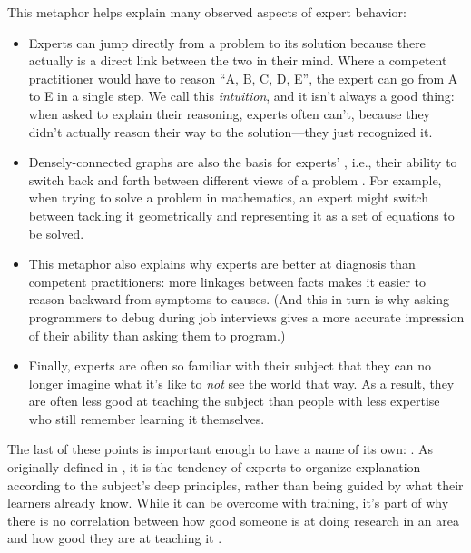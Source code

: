 This metaphor helps explain many observed aspects of expert behavior:

\begin{itemize}

\item
  Experts can jump directly from a problem to its solution because there
  actually is a direct link between the two in their mind. Where a
  competent practitioner would have to reason ``A, B, C, D, E'', the
  expert can go from A to E in a single step. We call this
  \emph{intuition}, and it isn't always a good thing: when asked to
  explain their reasoning, experts often can't, because they didn't
  actually reason their way to the solution---they just recognized it.

\item
  Densely-connected graphs are also the basis for experts'
  , i.e.,
  their ability to switch back and forth between different views of a
  problem \cite{Petr2016}. For example, when trying to solve a problem
  in mathematics, an expert might switch between tackling it
  geometrically and representing it as a set of equations to be
  solved.

\item
  This metaphor also explains why experts are better at diagnosis than
  competent practitioners: more linkages between facts makes it easier
  to reason backward from symptoms to causes. (And this in turn is why
  asking programmers to debug during job interviews gives a more
  accurate impression of their ability than asking them to program.)

\item
  Finally, experts are often so familiar with their subject that they
  can no longer imagine what it's like to \emph{not} see the world
  that way. As a result, they are often less good at teaching the
  subject than people with less expertise who still remember learning
  it themselves.

\end{itemize}

The last of these points is important enough to have a name of its
own: .  As originally
defined in \cite{Nath2003}, it is the tendency of experts to organize
explanation according to the subject's deep principles, rather than
being guided by what their learners already know.  While it can be
overcome with training, it's part of why there is no correlation
between how good someone is at doing research in an area and how good
they are at teaching it \cite{Mars2002}.


